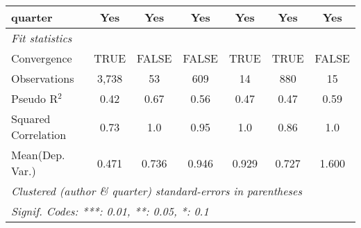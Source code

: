 \begin{tabular}{lcccccc}
   quarter                                                    & Yes           & Yes           & Yes          & Yes            & Yes           & Yes\\  
   \midrule
   \emph{Fit statistics}\\
   Convergence                                                &TRUE           & FALSE         & FALSE        & TRUE           & TRUE          & FALSE\\  
   Observations                                               & 3,738         & 53            & 609          & 14             & 880           & 15\\  
   Pseudo R$^2$                                               & 0.42          & 0.67          & 0.56         & 0.47           & 0.47          & 0.59\\  
   Squared Correlation                                        & 0.73          & 1.0           & 0.95         & 1.0            & 0.86          & 1.0\\  
Mean(Dep. Var.) & 0.471 & 0.736 & 0.946 & 0.929 & 0.727 & 1.600 \\
   \midrule \midrule
   \multicolumn{7}{l}{\emph{Clustered (author \& quarter) standard-errors in parentheses}}\\
   \multicolumn{7}{l}{\emph{Signif. Codes: ***: 0.01, **: 0.05, *: 0.1}}\\
\end{tabular}
\par\endgroup
